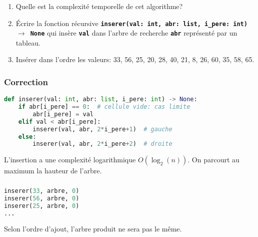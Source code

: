 \documentclass[svgnames,11pt]{beamer}
\begin{document}
\begin{frame}
    \frametitle{}

    \begin{activite}
        \begin{enumerate}
            \item Quelle est la complexité temporelle de cet algorithme?
            \item Écrire la fonction récursive \textbf{\texttt{inserer(val: int, abr: list, i\_pere: int) $\rightarrow$ None}} qui insère \textbf{\texttt{val}} dans l'arbre de recherche \textbf{\texttt{abr}} représenté par un tableau.
            \item Insérer dans l'ordre les valeurs: 33, 56, 25, 20, 28, 40, 21, 8, 26, 60, 35, 58, 65.
        \end{enumerate}
    \end{activite}

\end{frame}
\begin{frame}[fragile]
    \frametitle{Correction}

    \begin{center}
        \begin{lstlisting}[language=Python , basicstyle=\ttfamily\small, xleftmargin=.5em, xrightmargin=-1em]
def inserer(val: int, abr: list, i_pere: int) -> None:
    if abr[i_pere] == 0:  # cellule vide: cas limite
        abr[i_pere] = val
    elif val < abr[i_pere]:
        inserer(val, abr, 2*i_pere+1)  # gauche
    else:
        inserer(val, abr, 2*i_pere+2)  # droite
\end{lstlisting}
    \end{center}
    \begin{aretenir}[]
        L'insertion a une complexité logarithmique $O(\log_2(n))$. On parcourt au maximum la hauteur de l'arbre.
    \end{aretenir}
\end{frame}
\begin{frame}[fragile]
    \frametitle{}

    \begin{center}
        \begin{lstlisting}[language=Python , basicstyle=\ttfamily\small, xleftmargin=2em, xrightmargin=2em]
inserer(33, arbre, 0)
inserer(56, arbre, 0)
inserer(25, arbre, 0)
...
\end{lstlisting}
    \end{center}
    \begin{aretenir}[Remarque]
        Selon l'ordre d'ajout, l'arbre produit ne sera pas le même.
    \end{aretenir}
\end{frame}
\end{document}
